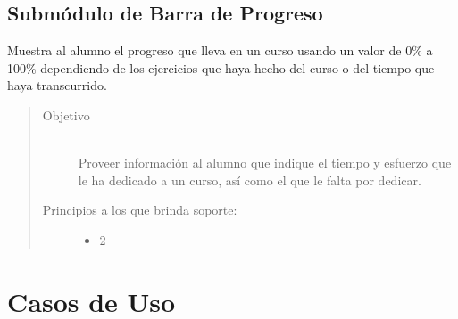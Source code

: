 
\subsection{Submódulo de Barra de Progreso}

Muestra al alumno el progreso que lleva en un curso usando un valor de 0\% a 100\% dependiendo de los ejercicios que haya hecho del curso o del tiempo que haya transcurrido.
    
    \begin{quote}
    \begin{description}
        \item[Objetivo] \hfill\\
            Proveer información al alumno que indique el tiempo y esfuerzo que le ha dedicado a un curso, así como el que le falta por dedicar.
            
        \item[Principios a los que brinda soporte:] \hfill
        \begin{itemize}
            \item 2 \principioII
        \end{itemize}
    \end{description}
    \end{quote}
    


\clearpage
\section{Casos de Uso}
    
